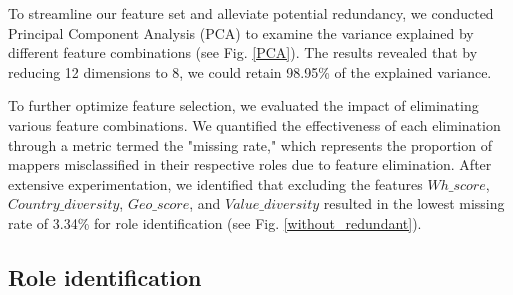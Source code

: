 \documentclass[manuscript,screen,review]{acmart}
\begin{document}
To streamline our feature set and alleviate potential redundancy, we conducted Principal Component Analysis (PCA) to examine the variance explained by different feature combinations (see Fig. \ref{PCA}). The results revealed that by reducing 12 dimensions to 8, we could retain 98.95\% of the explained variance. 

To further optimize feature selection, we evaluated the impact of eliminating various feature combinations. We quantified the effectiveness of each elimination through a metric termed the "missing rate," which represents the proportion of mappers misclassified in their respective roles due to feature elimination. After extensive experimentation, we identified that excluding the features $Wh\_score$, $Country\_diversity$, $Geo\_score$, and $Value\_diversity$ resulted in the lowest missing rate of 3.34\% for role identification (see Fig. \ref{without_redundant}).

\subsection{Role identification}
\end{document}
